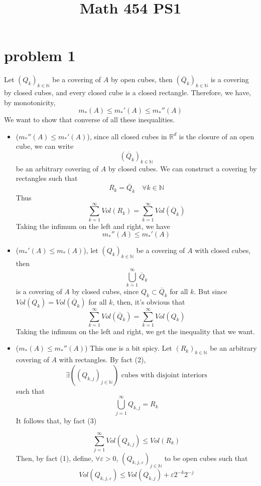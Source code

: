 \documentclass[12pt]{article}
\title{Math 454 PS1}
\begin{document}
	\maketitle
	\section{problem 1}
	Let $(Q_k)_{k \in \mathbb{N}}$ be a covering of $A$ by open cubes, then $(\overline{Q}_k)_{k \in \mathbb{N}}$ is a covering by closed cubes, and every closed cube is a closed rectangle. Therefore, we have, by monotonicity, 
	$$ m_*(A) \leq m_*'(A) \leq m_*''(A) $$
	We want to show that converse of all these inequalities. 
	\begin{itemize}
		\item ($m_*''(A) \leq m_*'(A)$), since all closed cubes in $\mathbb{R}^d$ is the closure of an open cube, we can write 
			$$(\overline{Q}_k)_{k \in \mathbb{N}}$$
			be an arbitrary covering of $A$ by closed cubes. We can construct a covering by rectangles such that 
			$$ R_k = \overline{Q}_k \quad \forall k \in \mathbb{N}$$
			Thus 
			$$ \sum_{k = 1}^\infty Vol(R_k) = \sum_{k = 1}^\infty Vol(\overline{Q}_k)$$
			Taking the infimum on the left and right, we have 
			$$ m_*''(A) \leq m_*'(A)$$
		\item ($m_*'(A) \leq m_*(A)$), let $(Q_k)_{k \in \mathbb{N}}$ be a covering of $A$ with closed cubes, then 
			$$\bigcup_{k =1}^\infty \overline{Q}_k$$ 
		is a covering of $A$ by closed cubes, since $Q_k \subset \overline{Q}_k$ for all $k$. But since $Vol(Q_k) = Vol(\overline{Q}_k)$ for all $k$, then, it's obvious that
		$$\sum_{k = 1}^\infty  Vol(\overline{Q}_k) = \sum_{k=1}^\infty Vol(Q_k)$$
		Taking the infimum on the left and right, we get the inequality that we want.
	\item ($m_*(A) \leq m_*''(A)$) This one is a bit spicy. Let $(R_k)_{k \in \mathbb{N}}$ be an arbitrary covering of $A$ with rectangles. By fact (2),
		$$ \exists ((Q_{k,j})_{j \in \mathbb{N}}) \text{ cubes with disjoint interiors}$$
		such that 
		$$\bigcup_{j = 1}^\infty Q_{k,j} = R_k$$
		It follows that, by fact (3)
		
		$$ \sum_{j=1}^\infty Vol(Q_{k,j}) \leq Vol(R_k)$$
		Then, by fact (1), define, $\forall \varepsilon >0$, $(Q_{k,j,\varepsilon})_{j \in \mathbb{N}}$ to be open cubes such that 
		$$Vol(Q_{k,j,\varepsilon}) \leq Vol(Q_{k,j}) + \varepsilon2^{-k} 2^{-j}$$


\end{itemize}
\end{document}
